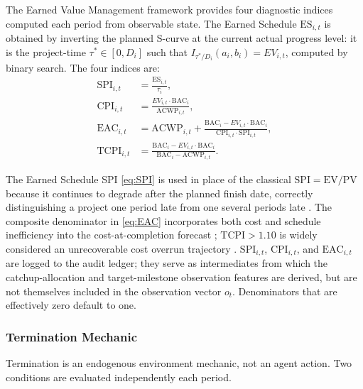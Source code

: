 The Earned Value Management framework \citep{Fleming2010} provides
four diagnostic indices computed each period from observable state.
The Earned Schedule $\mathrm{ES}_{i,t}$ is obtained by inverting the
planned S-curve at the current actual progress level: it is the
project-time $\tau^* \in [0, D_i]$ such that $I_{\tau^*/D_i}(a_i,
b_i) = EV_{i,t}$, computed by binary search. The four indices are:
\begin{align}
  \mathrm{SPI}_{i,t}
    &= \frac{\mathrm{ES}_{i,t}}{\tau_i},
  \label{eq:SPI} \\
  \mathrm{CPI}_{i,t}
    &= \frac{EV_{i,t} \cdot \mathrm{BAC}_i}{\mathrm{ACWP}_{i,t}},
  \label{eq:CPI} \\
  \mathrm{EAC}_{i,t}
    &= \mathrm{ACWP}_{i,t}
       + \frac{\mathrm{BAC}_i - EV_{i,t} \cdot \mathrm{BAC}_i}
              {\mathrm{CPI}_{i,t} \cdot \mathrm{SPI}_{i,t}},
  \label{eq:EAC} \\
  \mathrm{TCPI}_{i,t}
    &= \frac{\mathrm{BAC}_i - EV_{i,t} \cdot \mathrm{BAC}_i}
            {\mathrm{BAC}_i - \mathrm{ACWP}_{i,t}}.
  \label{eq:TCPI}
\end{align}

The Earned Schedule SPI \eqref{eq:SPI} is used in place of the
classical $\mathrm{SPI} = \mathrm{EV}/\mathrm{PV}$ because it
continues to degrade after the planned finish date, correctly
distinguishing a project one period late from one several periods late
\citep{Lipke2003}. The composite denominator in \eqref{eq:EAC}
incorporates both cost and schedule inefficiency into the
cost-at-completion forecast \citep{christensen1993est}; $\mathrm{TCPI}
> 1.10$ is widely considered an unrecoverable cost overrun trajectory
\citep{Fleming2010}. $\mathrm{SPI}_{i,t}$, $\mathrm{CPI}_{i,t}$, 
and $\mathrm{EAC}_{i,t}$ are logged to the audit ledger; they serve as intermediates from which the catchup-allocation and
target-milestone observation features are derived, but are not
themselves included in the observation vector $o_t$.
Denominators that are effectively zero default to one.

\subsubsection{Termination Mechanic}
\label{subsubsec:termination}

Termination is an endogenous environment mechanic, not an agent
action. Two conditions are evaluated independently each period.


